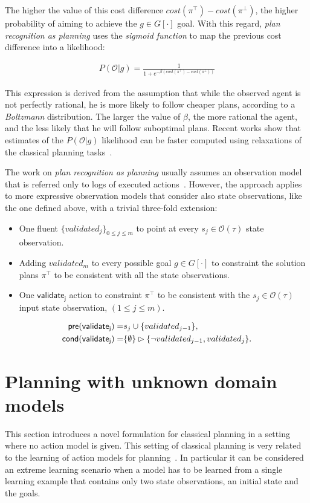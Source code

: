 \documentclass{article}
\newcommand{\pre}{\mathsf{pre}}     %
\newcommand{\cond}{\mathsf{cond}}   %
\begin{document}
The higher the value of this cost difference $cost(\pi^\top)-cost(\pi^\bot)$, the higher probability of aiming to achieve the $g\in G[\cdot]$ goal. With this regard, {\em plan recognition as planning} uses the {\em sigmoid function} to map the previous cost difference into a likelihood:

\begin{align}
P(\mathcal{O}|g) = \frac{1}{1+e^{-\beta(cost(\pi^\top)-cost(\pi^\bot))}}
\end{align}

This expression is derived from the assumption that while the observed agent is not perfectly rational, he is more likely to follow cheaper plans, according to a {\em Boltzmann} distribution. The larger the value of $\beta$, the more rational the agent, and the less likely that he will follow suboptimal plans. Recent works show that estimates of the $P(\mathcal{O}|g)$ likelihood can be faster computed using relaxations of the classical planning tasks~\cite{pereira2017landmark}.

The work on {\em plan recognition as planning} usually assumes an observation model that is referred only to logs of executed actions~\cite{ramirez2009plan}. However, the approach applies to more expressive observation models that consider also state observations, like the one defined above, with a trivial three-fold extension:
\begin{itemize}
\item One fluent $\{validated_j\}_{0\leq j\leq m}$ to point at every $s_j\in\mathcal{O}(\tau)$ state observation.
\item Adding $validated_m$ to every possible goal $g\in G[\cdot]$ to constraint the solution plans $\pi^\top$ to be consistent with all the state observations.
\item One $\mathsf{validate_{j}}$ action to constraint $\pi^\top$ to be consistent with the $s_j\in\mathcal{O}(\tau)$ input state observation, {\small $(1\leq j\leq m)$}.  
\end{itemize}
\begin{small}
\begin{align*}
\hspace*{7pt}\pre(\mathsf{validate_{j}})=&s_j\cup\{validated_{j-1}\},\\
\cond(\mathsf{validate_{j}})=&\{\emptyset\}\rhd\{\neg validated_{j-1}, validated_j\}.
\end{align*}
\end{small}


\section{Planning with unknown domain models}
\label{sec:planning}
This section introduces a novel formulation for classical planning in a setting where no action model is given. This setting of classical planning is very related to the learning of action models for planning~\cite{SternJ17}. In particular it can be considered an extreme learning scenario when a model has to be learned from a single learning example that contains only two state observations, an initial state and the goals.
\end{document}
